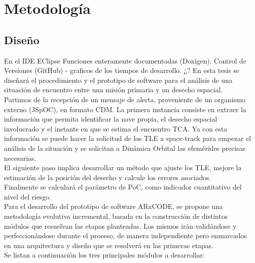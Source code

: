 \chapter{Metodología}
\label{chap:metodologia}


\section{Diseño}
En el IDE EClipse
Funciones enteramente documentadas (Doxigen).
Control de Versiones (GitHub) - graficos de los tiempos de desarrollo. ¿?
En esta tesis se dise\~nar\'a el procedimiento y el prototipo de software para el an\'alisis de una situaci\'on de encuentro entre una misi\'on primaria y un desecho espacial.\\
Partimos de la recepci\'on de un mensaje de alerta, proveniente de un organismo externo (JSpOC), en formato CDM. La primera instancia consiste en extraer la informaci\'on que permita identificar la nave propia, el desecho espacial involucrado y el instante en que se estima el encuentro \ac{TCA}. Ya con esta informaci\'on se puede hacer la solicitud de los TLE a space-track para empezar el an\'alisis de la situaci\'on y se solicitan a Din\'amica Orbital las efem\'erides precisas necesarias.\\
El siguiente paso implica desarrollar un m\'etodo que ajuste los TLE, mejore la estimaci\'on de la posici\'on del desecho y calcule los errores asociados.\\
Finalmente se calcular\'a el par\'ametro de \ac{PoC}, como indicador cuantitativo del nivel del riesgo.\\

Para el desarrollo del prototipo de software ARxCODE, se propone una metodolog\'ia evolutiva incremental, basada en la construcci\'on de distintos m\'odulos que resuelvan las etapas planteadas. Los mismos ir\'an valid\'andose y perfeccion\'andose durante el proceso, de manera independiente pero enmarcados en una arquitectura y dise\~no que se resolver\'a en las primeras etapas.\\
Se listan a continuaci\'on los tres principales m\'odulos a desarrollar:\\ 

